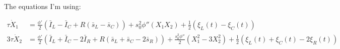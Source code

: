 \documentclass[ENG]{fancynotes}
\begin{document}
The equations I'm using:

\begin{equation}
\begin{aligned}
\tau \dot{X}_1 &= \frac{\phi'}{2}(\bar{I}_L -  \bar{I}_C + R (\bar{s}_L - \bar{s}_C)) + s_0^2\phi''(X_1X_2) + \frac{1}{2}(\xi_L(t)-\xi_C(t)) \\[8pt]
3\tau \dot{X}_2 &= \frac{\phi'}{2}(\bar{I}_L +  \bar{I}_C - 2 \bar{I}_R +  R (\bar{s}_L+ \bar{s}_C -2\bar{s}_R) ) + \frac{s_0^2\phi''}{2}(X_1^2-3X_2^2) + \frac{1}{2}(\xi_L(t)+\xi_C(t)-2\xi_R(t))
\end{aligned}
\label{eq:secondorder}
\end{equation}
\end{document}
